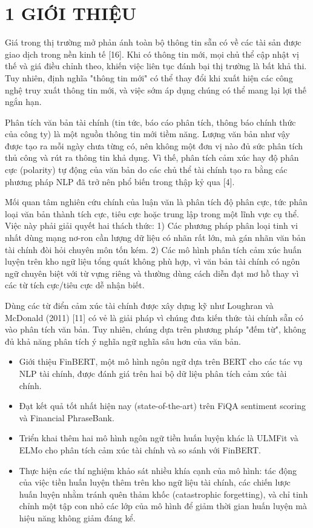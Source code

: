 \section{1 GIỚI THIỆU}

Giá trong thị trường mở phản ánh toàn bộ thông tin sẵn có về các tài sản được giao dịch trong nền kinh tế {[}16{]}. Khi có thông tin mới, mọi chủ thể cập nhật vị thế và giá điều chỉnh theo, khiến việc liên tục đánh bại thị trường là bất khả thi. Tuy nhiên, định nghĩa "thông tin mới" có thể thay đổi khi xuất hiện các công nghệ truy xuất thông tin mới, và việc sớm áp dụng chúng có thể mang lại lợi thế ngắn hạn.

Phân tích văn bản tài chính (tin tức, báo cáo phân tích, thông báo chính thức của công ty) là một nguồn thông tin mới tiềm năng. Lượng văn bản như vậy được tạo ra mỗi ngày chưa từng có, nên không một đơn vị nào đủ sức phân tích thủ công và rút ra thông tin khả dụng. Vì thế, phân tích cảm xúc hay độ phân cực (polarity) tự động của văn bản do các chủ thể tài chính tạo ra bằng các phương pháp NLP đã trở nên phổ biến trong thập kỷ qua {[}4{]}.

Mối quan tâm nghiên cứu chính của luận văn là phân tích độ phân cực, tức phân loại văn bản thành tích cực, tiêu cực hoặc trung lập trong một lĩnh vực cụ thể. Việc này phải giải quyết hai thách thức: 1) Các phương pháp phân loại tinh vi nhất dùng mạng nơ-ron cần lượng dữ liệu có nhãn rất lớn, mà gán nhãn văn bản tài chính đòi hỏi chuyên môn tốn kém. 2) Các mô hình phân tích cảm xúc huấn luyện trên kho ngữ liệu tổng quát không phù hợp, vì văn bản tài chính có ngôn ngữ chuyên biệt với từ vựng riêng và thường dùng cách diễn đạt mơ hồ thay vì các từ tích cực/tiêu cực dễ nhận biết.

Dùng các từ điển cảm xúc tài chính được xây dựng kỹ như Loughran và McDonald (2011) {[}11{]} có vẻ là giải pháp vì chúng đưa kiến thức tài chính sẵn có vào phân tích văn bản. Tuy nhiên, chúng dựa trên phương pháp "đếm từ", không đủ khả năng phân tích ý nghĩa ngữ nghĩa sâu hơn của văn bản.

\begin{itemize}
\item
  Giới thiệu FinBERT, một mô hình ngôn ngữ dựa trên BERT cho các tác vụ NLP tài chính, được đánh giá trên hai bộ dữ liệu phân tích cảm xúc tài chính.
\item
  Đạt kết quả tốt nhất hiện nay (state-of-the-art) trên FiQA sentiment scoring và Financial PhraseBank.
\item
  Triển khai thêm hai mô hình ngôn ngữ tiền huấn luyện khác là ULMFit và ELMo cho phân tích cảm xúc tài chính và so sánh với FinBERT.
\item
  Thực hiện các thí nghiệm khảo sát nhiều khía cạnh của mô hình: tác động của việc tiền huấn luyện thêm trên kho ngữ liệu tài chính, các chiến lược huấn luyện nhằm tránh quên thảm khốc (catastrophic forgetting), và chỉ tinh chỉnh một tập con nhỏ các lớp của mô hình để giảm thời gian huấn luyện mà hiệu năng không giảm đáng kể.
\end{itemize}

